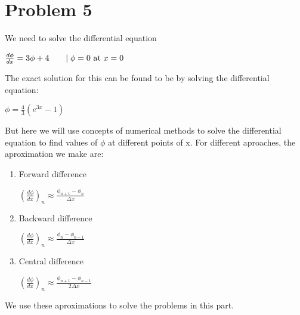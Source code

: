 \documentclass{article}
\begin{document}
    \section{Problem 5}
        We need to solve the differential equation\\
        \centerline{$\frac{d \phi}{d x} = 3\phi + 4 \hspace{6mm} \mid \phi=0 \ \mathrm{at} \ x=0$}
        The exact solution for this can be found to be by solving the differential equation:\\ 
        \centerline{$\phi = \frac{4}{3}(e^{3x}-1)$}
        But here we will use concepts of numerical methods to solve the differential equation to find values of $\phi$ at different points of x.
        For different aproaches, the aproximation we make are:\\
        \begin{enumerate}
            \item Forward difference\\ \centerline{$(\frac{d \phi}{d x})_n \approx \frac{\phi_{n+1} - \phi_{n}}{\Delta x}$}
            \item Backward difference\\ \centerline{$(\frac{d \phi}{d x})_n \approx \frac{\phi_{n} - \phi_{n-1}}{\Delta x}$}
            \item Central difference\\ \centerline{$(\frac{d \phi}{d x})_n \approx \frac{\phi_{n+1} - \phi_{n-1}}{2 \Delta x}$}
        \end{enumerate}
        We use these aproximations to solve the problems in this part.
\end{document}
